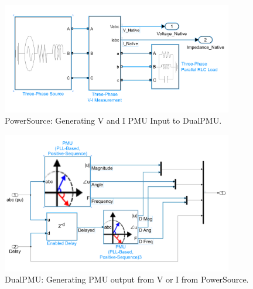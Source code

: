 



 \begin{figure}
\includegraphics[width=0.9\textwidth]{figures/PowerSourceSubsystem.png}
\caption[PowerSource SIMULINK subsystem]{PowerSource: Generating  V and I PMU Input to DualPMU.}
\label{fig:PowerSource}
\end{figure}


 \begin{figure}
\includegraphics[width=0.9\textwidth]{figures/DualPMUsubsystem.png}
\caption[DualPMU SIMULINK subsystem]{DualPMU: Generating PMU output from V or I from PowerSource.}
\label{fig:DualPMU}

\end{figure}


